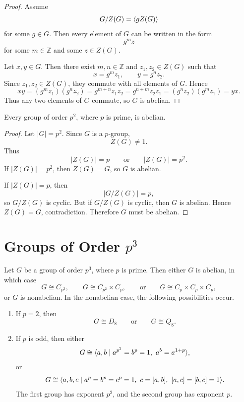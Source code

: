     \begin{proof}
    Assume
    \[
        G/Z(G)=\langle gZ(G)\rangle
    \]
    for some \(g\in G\). Then every element of \(G\) can be written in the form
    \[
        g^m z
    \]
    for some \(m\in \mathbb Z\) and some \(z\in Z(G)\).
    
    Let \(x,y\in G\). Then there exist \(m,n\in\mathbb Z\) and
    \(z_1,z_2\in Z(G)\) such that
    \[
        x=g^m z_1,
        \qquad
        y=g^n z_2.
    \]
    Since \(z_1,z_2\in Z(G)\), they commute with all elements of \(G\). Hence
    \[
        xy
        =
        (g^m z_1)(g^n z_2)
        =
        g^{m+n}z_1z_2
        =
        g^{n+m}z_2z_1
        =
        (g^n z_2)(g^m z_1)
        =
        yx.
    \]
    Thus any two elements of \(G\) commute, so \(G\) is abelian.
    \end{proof}

\begin{corollary}
Every group of order \(p^2\), where \(p\) is prime, is abelian.
\end{corollary}

\begin{proof}
Let \(|G|=p^2\). Since \(G\) is a \(p\)-group,
\[
    Z(G)\neq 1.
\]
Thus
\[
    |Z(G)|=p
    \qquad\text{or}\qquad
    |Z(G)|=p^2.
\]
If \(|Z(G)|=p^2\), then \(Z(G)=G\), so \(G\) is abelian.

If \(|Z(G)|=p\), then
\[
    |G/Z(G)|=p,
\]
so \(G/Z(G)\) is cyclic. But if \(G/Z(G)\) is cyclic, then \(G\) is abelian. Hence \(Z(G)=G\), contradiction. Therefore \(G\) must be abelian.
\end{proof}

\section{Groups of Order \texorpdfstring{$p^3$}{p3}}

\begin{theorem}
Let \(G\) be a group of order \(p^3\), where \(p\) is prime. Then either \(G\) is abelian, in which case
\[
    G\cong C_{p^3},
    \qquad
    G\cong C_{p^2}\times C_p,
    \qquad\text{or}\qquad
    G\cong C_p\times C_p\times C_p,
\]
or \(G\) is nonabelian. In the nonabelian case, the following possibilities occur.

\begin{enumerate}[label=(\arabic*)]
    \item If \(p=2\), then
    \[
        G\cong D_8
        \qquad\text{or}\qquad
        G\cong Q_8.
    \]

    \item If \(p\) is odd, then either
    \[
        G\cong
        \langle 
            a,b
            \mid
            a^{p^2}=b^p=1,\ a^b=a^{1+p}
        \rangle,
    \]
    or
    \[
        G\cong
        \langle 
            a,b,c
            \mid
            a^p=b^p=c^p=1,\ c=[a,b],\ [a,c]=[b,c]=1
        \rangle.
    \]
    The first group has exponent \(p^2\), and the second group has exponent \(p\).
\end{enumerate}
\end{theorem}

